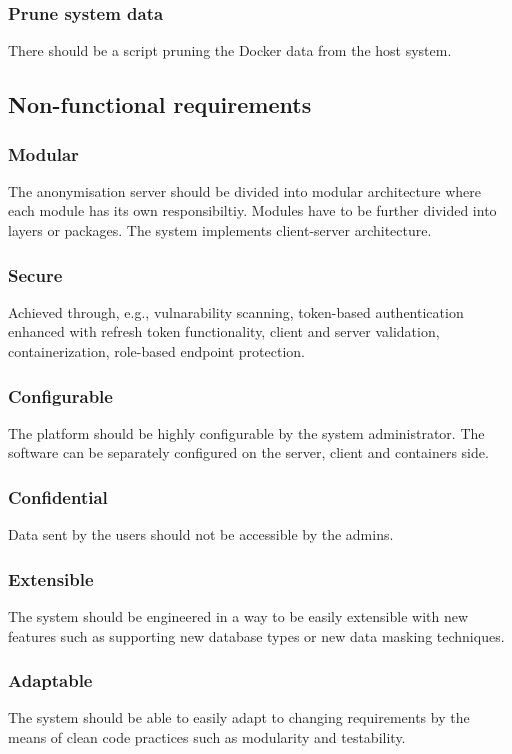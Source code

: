 \documentclass[a4paper,twoside,12pt]{book}
\begin{document}
\subsubsection{Prune system data}

There should be a script pruning the Docker data from the host system.


\subsection{Non-functional requirements}

\subsubsection{Modular}
The anonymisation server should be divided into modular architecture where each module has its own responsibiltiy. Modules have to be further divided into layers or packages. The system implements client-server architecture.

\subsubsection{Secure}
Achieved through, e.g., vulnarability scanning, token-based authentication enhanced with refresh token functionality, client and server validation, containerization, role-based endpoint protection.

\subsubsection{Configurable}
The platform should be highly configurable by the system administrator. The software can be separately configured on the server, client and containers side.

\subsubsection{Confidential}
Data sent by the users should not be accessible by the admins.

\subsubsection{Extensible}
The system should be engineered in a way to be easily extensible with new features such as supporting new database types or new data masking techniques.

\subsubsection{Adaptable}
The system should be able to easily adapt to changing requirements by the means of clean code practices such as modularity and testability.
\end{document}

